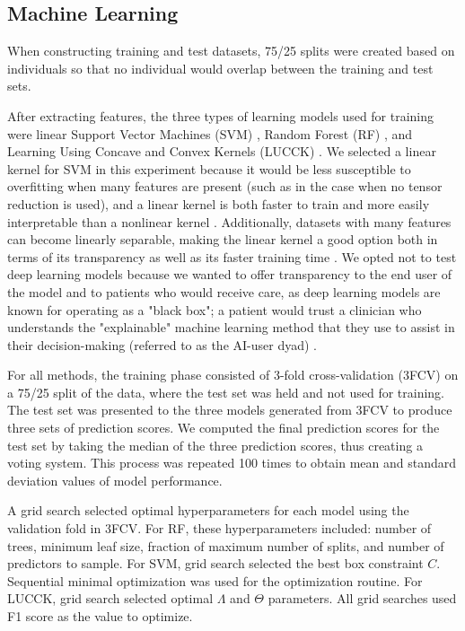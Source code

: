 \subsection*{Machine Learning} \label{sec:methods_ml}
When constructing training and test datasets, 75/25 splits were created based on individuals so that no individual would overlap between the training and test sets.

After extracting features, the three types of learning models used for training were linear Support Vector Machines (SVM) \autocite{cortes_support-vector_1995}, Random Forest (RF) \autocite{breiman_random_2001}, and Learning Using Concave and Convex Kernels (LUCCK) \autocite{sabeti_learning_2019}. We selected a linear kernel for SVM in this experiment because it would be less susceptible to overfitting when many features are present \autocite{han_overcome_2014} (such as in the case when no tensor reduction is used), and a linear kernel is both faster to train and more easily interpretable than a nonlinear kernel \autocite{huang_applications_2018}. Additionally, datasets with many features can become linearly separable, making the linear kernel a good option both in terms of its transparency as well as its faster training time \autocite{cervantes_comprehensive_2020}. We opted not to test deep learning models because we wanted to offer transparency to the end user of the model and to patients who would receive care, as deep learning models are known for operating as a "black box"; a patient would trust a clinician who understands the "explainable" machine learning method that they use to assist in their decision-making (referred to as the AI-user dyad) \autocite{ferrario_how_2022}.

For all methods, the training phase consisted of 3-fold cross-validation (3FCV) on a 75/25 split of the data, where the test set was held and not used for training. The test set was presented to the three models generated from 3FCV to produce three sets of prediction scores. We computed the final prediction scores for the test set by taking the median of the three prediction scores, thus creating a voting system. This process was repeated 100 times to obtain mean and standard deviation values of model performance. 

A grid search selected optimal hyperparameters for each model using the validation fold in 3FCV. For RF, these hyperparameters included: number of trees, minimum leaf size, fraction of maximum number of splits, and number of predictors to sample. For SVM, grid search selected the best box constraint $C$. Sequential minimal optimization \autocite{JMLR:v6:fan05a} was used for the optimization routine. For LUCCK, grid search selected optimal $\Lambda$ and $\Theta$ parameters. All grid searches used F1 score as the value to optimize. 

